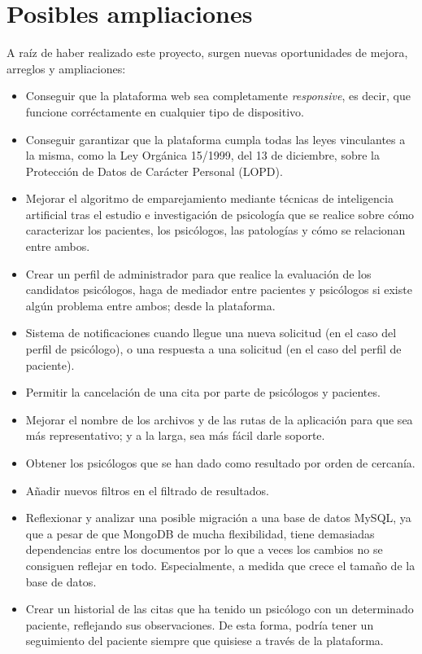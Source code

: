 \section{Posibles ampliaciones}
A raíz de haber realizado este proyecto, surgen nuevas oportunidades de mejora, arreglos y ampliaciones:
\begin{itemize}
\item Conseguir que la plataforma web sea completamente \textit{responsive}, es decir, que funcione corréctamente en cualquier tipo de dispositivo.
\item Conseguir garantizar que la plataforma cumpla todas las leyes vinculantes a la misma, como la Ley Orgánica 15/1999, del 13 de diciembre, sobre la Protección de Datos de Carácter Personal (LOPD).
\item Mejorar el algoritmo de emparejamiento mediante técnicas de inteligencia artificial tras el estudio e investigación de psicología que se realice sobre cómo caracterizar los pacientes, los psicólogos, las patologías y cómo se relacionan entre ambos.
\item Crear un perfil de administrador para que realice la evaluación de los candidatos psicólogos, haga de mediador entre pacientes y psicólogos si existe algún problema entre ambos; desde la plataforma.
\item Sistema de notificaciones cuando llegue una nueva solicitud (en el caso del perfil de psicólogo), o una respuesta a una solicitud (en el caso del perfil de paciente).
\item Permitir la cancelación de una cita por parte de psicólogos y pacientes.
\item Mejorar el nombre de los archivos y de las rutas de la aplicación para que sea más representativo; y a la larga, sea más fácil darle soporte.
\item Obtener los psicólogos que se han dado como resultado por orden de cercanía.
\item Añadir nuevos filtros en el filtrado de resultados.
\item Reflexionar y analizar una posible migración a una base de datos MySQL, ya que a pesar de que MongoDB de mucha flexibilidad, tiene demasiadas dependencias entre los documentos por lo que a veces los cambios no se consiguen reflejar en todo. Especialmente, a medida que crece el tamaño de la base de datos. 
\item Crear un historial de las citas que ha tenido un psicólogo con un determinado paciente, reflejando sus observaciones. De esta forma, podría tener un seguimiento del paciente siempre que quisiese a través de la plataforma.
\end{itemize}